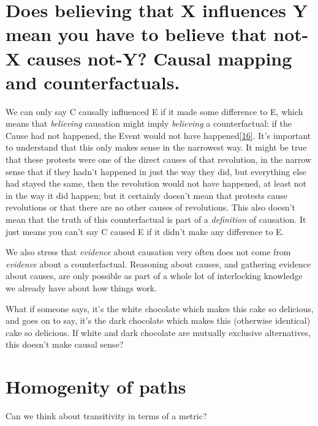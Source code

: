 \documentclass[
]{book}
\begin{document}
\hypertarget{does-believing-that-x-influences-y-mean-you-have-to-believe-that-not-x-causes-not-y-causal-mapping-and-counterfactuals.}{%
\section{Does believing that X influences Y mean you have to believe that not-X causes not-Y? Causal mapping and counterfactuals.}\label{does-believing-that-x-influences-y-mean-you-have-to-believe-that-not-x-causes-not-y-causal-mapping-and-counterfactuals.}}

We can only say C causally influenced E if it made some difference to E, which means that \emph{believing} causation might imply \emph{believing} a counterfactual: if the Cause had not happened, the Event would not have happened{[}\protect\hyperlink{_ftn16}{16{]}}. It's important to understand that this only makes sense in the narrowest way. It might be true that these protests were one of the direct causes of that revolution, in the narrow sense that if they hadn't happened in just the way they did, but everything else had stayed the same, then the revolution would not have happened, at least not in the way it did happen; but it certainly doesn't mean that protests cause revolutions or that there are no other causes of revolutions. This also doesn't mean that the truth of this counterfactual is part of a \emph{definition} of causation. It just means you can't say C caused E if it didn't make any difference to E.

We also stress that \emph{evidence} about causation very often does not come from \emph{evidence} about a counterfactual. Reasoning about causes, and gathering evidence about causes, are only possible as part of a whole lot of interlocking knowledge we already have about how things work.

What if someone says, it's the white chocolate which makes this cake so delicious, and goes on to say, it's the dark chocolate which makes this (otherwise identical) cake so delicious. If white and dark chocolate are mutually exclusive alternatives, this doesn't make causal sense?

\hypertarget{homogenity-of-paths}{%
\section{Homogenity of paths}\label{homogenity-of-paths}}

Can we think about transitivity in terms of a metric?
\end{document}
